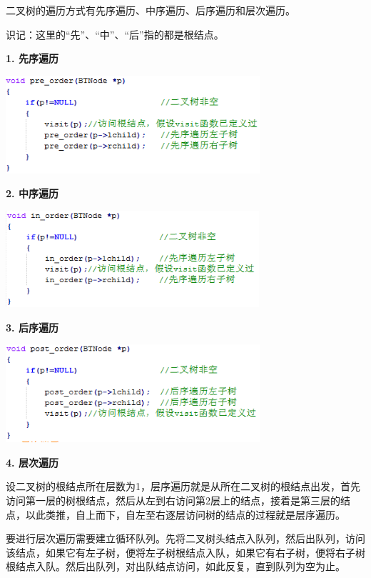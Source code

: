 {二叉树的遍历方式有{先序遍历、中序遍历、后序遍历和层次遍历}。}

{识记：这里的``先''、``中''、``后''指的都是根结点。}

{\textbf{1. 先序遍历}}

\includegraphics[width=3.70833in,height=1.42708in]{png-jpeg-pics/E4B93F3652A5B6AEA48E90F5E7B51671.png}

{\textbf{2. 中序遍历}}{}{}

\includegraphics[width=3.70833in,height=1.40625in]{png-jpeg-pics/AA7041D42D263BEB9BB27E2D52669F00.png}

{\textbf{3. 后序遍历}\\
}

\includegraphics[width=3.70833in,height=1.42708in]{png-jpeg-pics/DA6263531CC4AB6CAFCB3A75F5C3FC2A.png}

{\textbf{4. 层次遍历}}

{设二叉树的根结点所在层数为1，层序遍历就是从所在二叉树的根结点出发，首先访问第一层的树根结点，然后从左到右访问第2层上的结点，接着是第三层的结点，以此类推，{自上而下，自左至右逐层访问树的结点的过程就是层序遍历}。}

{要进行层次遍历需要建立{循环队列}。先将二叉树头结点入队列，然后出队列，访问该结点，如果它有左子树，便将左子树根结点入队，如果它有右子树，便将右子树根结点入队。然后出队列，对出队结点访问，如此反复，直到队列为空为止。}

